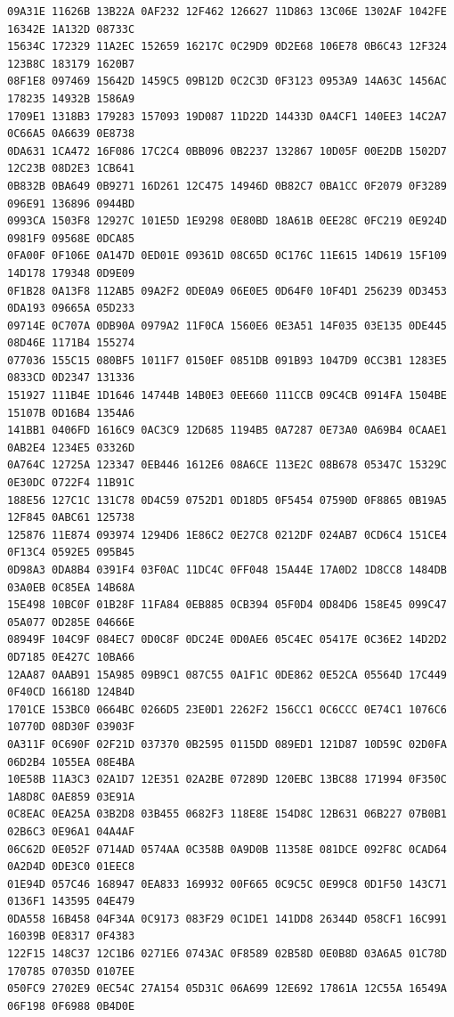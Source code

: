 \documentclass[11pt]{amsart}
\theoremstyle{remark}
\begin{document}
{\begin{verbatim}
09A31E 11626B 13B22A 0AF232 12F462 126627 11D863 13C06E 1302AF 1042FE 16342E 1A132D 08733C
15634C 172329 11A2EC 152659 16217C 0C29D9 0D2E68 106E78 0B6C43 12F324 123B8C 183179 1620B7
08F1E8 097469 15642D 1459C5 09B12D 0C2C3D 0F3123 0953A9 14A63C 1456AC 178235 14932B 1586A9
1709E1 1318B3 179283 157093 19D087 11D22D 14433D 0A4CF1 140EE3 14C2A7 0C66A5 0A6639 0E8738
0DA631 1CA472 16F086 17C2C4 0BB096 0B2237 132867 10D05F 00E2DB 1502D7 12C23B 08D2E3 1CB641
0B832B 0BA649 0B9271 16D261 12C475 14946D 0B82C7 0BA1CC 0F2079 0F3289 096E91 136896 0944BD
0993CA 1503F8 12927C 101E5D 1E9298 0E80BD 18A61B 0EE28C 0FC219 0E924D 0981F9 09568E 0DCA85
0FA00F 0F106E 0A147D 0ED01E 09361D 08C65D 0C176C 11E615 14D619 15F109 14D178 179348 0D9E09
0F1B28 0A13F8 112AB5 09A2F2 0DE0A9 06E0E5 0D64F0 10F4D1 256239 0D3453 0DA193 09665A 05D233
09714E 0C707A 0DB90A 0979A2 11F0CA 1560E6 0E3A51 14F035 03E135 0DE445 08D46E 1171B4 155274
077036 155C15 080BF5 1011F7 0150EF 0851DB 091B93 1047D9 0CC3B1 1283E5 0833CD 0D2347 131336
151927 111B4E 1D1646 14744B 14B0E3 0EE660 111CCB 09C4CB 0914FA 1504BE 15107B 0D16B4 1354A6
141BB1 0406FD 1616C9 0AC3C9 12D685 1194B5 0A7287 0E73A0 0A69B4 0CAAE1 0AB2E4 1234E5 03326D
0A764C 12725A 123347 0EB446 1612E6 08A6CE 113E2C 08B678 05347C 15329C 0E30DC 0722F4 11B91C
188E56 127C1C 131C78 0D4C59 0752D1 0D18D5 0F5454 07590D 0F8865 0B19A5 12F845 0ABC61 125738
125876 11E874 093974 1294D6 1E86C2 0E27C8 0212DF 024AB7 0CD6C4 151CE4 0F13C4 0592E5 095B45
0D98A3 0DA8B4 0391F4 03F0AC 11DC4C 0FF048 15A44E 17A0D2 1D8CC8 1484DB 03A0EB 0C85EA 14B68A
15E498 10BC0F 01B28F 11FA84 0EB885 0CB394 05F0D4 0D84D6 158E45 099C47 05A077 0D285E 04666E
08949F 104C9F 084EC7 0D0C8F 0DC24E 0D0AE6 05C4EC 05417E 0C36E2 14D2D2 0D7185 0E427C 10BA66
12AA87 0AAB91 15A985 09B9C1 087C55 0A1F1C 0DE862 0E52CA 05564D 17C449 0F40CD 16618D 124B4D
1701CE 153BC0 0664BC 0266D5 23E0D1 2262F2 156CC1 0C6CCC 0E74C1 1076C6 10770D 08D30F 03903F
0A311F 0C690F 02F21D 037370 0B2595 0115DD 089ED1 121D87 10D59C 02D0FA 06D2B4 1055EA 08E4BA
10E58B 11A3C3 02A1D7 12E351 02A2BE 07289D 120EBC 13BC88 171994 0F350C 1A8D8C 0AE859 03E91A
0C8EAC 0EA25A 03B2D8 03B455 0682F3 118E8E 154D8C 12B631 06B227 07B0B1 02B6C3 0E96A1 04A4AF
06C62D 0E052F 0714AD 0574AA 0C358B 0A9D0B 11358E 081DCE 092F8C 0CAD64 0A2D4D 0DE3C0 01EEC8
01E94D 057C46 168947 0EA833 169932 00F665 0C9C5C 0E99C8 0D1F50 143C71 0136F1 143595 04E479
0DA558 16B458 04F34A 0C9173 083F29 0C1DE1 141DD8 26344D 058CF1 16C991 16039B 0E8317 0F4383
122F15 148C37 12C1B6 0271E6 0743AC 0F8589 02B58D 0E0B8D 03A6A5 01C78D 170785 07035D 0107EE
050FC9 2702E9 0EC54C 27A154 05D31C 06A699 12E692 17861A 12C55A 16549A 06F198 0F6988 0B4D0E

\end{verbatim}}
\end{document}
